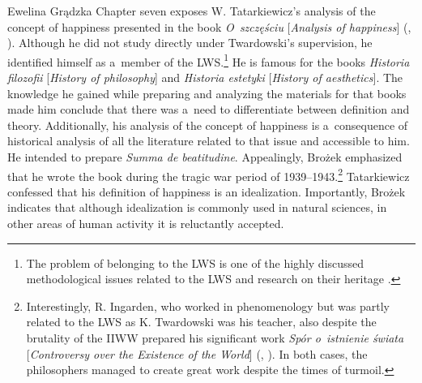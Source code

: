 \begin{newrevengenv}{Ewelina Grądzka}
Chapter seven exposes W. Tatarkiewicz's analysis of the concept of happiness presented in the book \textit{O~szczęściu} [\textit{Analysis of happiness}]
(\cite[][]{tatarkiewicz_o_1947}, \cite*[Eng. transl.][]{tatarkiewicz_analysis_1976}). %
 Although he did not study directly under Twardowski's supervision, he identified himself as a~member of the LWS.\footnote{The problem of belonging to the LWS is one of the highly discussed methodological issues related to the LWS and research on their heritage 
\parencite[cf.][p.338]{wolenski_filozoficzna_1985}.%
} He is famous for the books \textit{Historia filozofii} [\textit{History of philosophy}] and \textit{Historia estetyki} [\textit{History of aesthetics}]. The knowledge he gained while preparing and analyzing the materials for that books made him conclude that there was a~need to differentiate between definition and theory. Additionally, his analysis of the concept of happiness is a~consequence of historical analysis of all the literature related to that issue and accessible to him. He intended to prepare \textit{Summa de beatitudine}. Appealingly, Brożek emphasized that he wrote the book during the tragic war period of 1939--1943.\footnote{Interestingly, R. Ingarden, who worked in phenomenology but was partly related to the LWS as K. Twardowski was his teacher, also despite the brutality of the IIWW prepared his significant work \textit{Spór o~istnienie świata} [\textit{Controversy over the Existence of the World}] 
(\cite[][]{ingarden_spor_1947}, \cite*[Eng. transl.][]{ingarden_controversy_2013}). %
 In both cases, the philosophers managed to create great work despite the times of turmoil.} Tatarkiewicz confessed that his definition of happiness is an idealization. Importantly, Brożek indicates that although idealization is commonly used in natural sciences, in other areas of human activity it is reluctantly accepted.


\end{newrevengenv}
